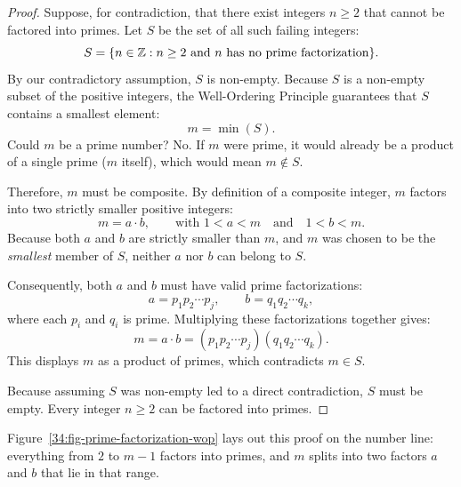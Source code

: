 \begin{proof}
Suppose, for contradiction, that there exist integers $n \geq 2$ that cannot be factored into primes. Let $S$ be the set of all such failing integers:
\[
S = \{n \in \mathbb{Z} : n \ge 2 \text{ and } n \text{ has no prime factorization}\}.
\]
By our contradictory assumption, $S$ is non-empty. Because $S$ is a non-empty subset of the positive integers, the Well-Ordering Principle guarantees that $S$ contains a smallest element:
\[
m = \min(S).
\]
Could $m$ be a prime number? No. If $m$ were prime, it would already be a product of a single prime ($m$ itself), which would mean $m \notin S$.

Therefore, $m$ must be composite. By definition of a composite integer, $m$ factors into two strictly smaller positive integers:
\[
m = a \cdot b, \qquad \text{with } 1 < a < m \quad \text{and} \quad 1 < b < m.
\]
Because both $a$ and $b$ are strictly smaller than $m$, and $m$ was chosen to be the \emph{smallest} member of $S$, neither $a$ nor $b$ can belong to $S$.

Consequently, both $a$ and $b$ must have valid prime factorizations:
\[
a = p_1 p_2 \cdots p_j, \qquad b = q_1 q_2 \cdots q_k,
\]
where each $p_i$ and $q_i$ is prime. Multiplying these factorizations together gives:
\[
m = a \cdot b = (p_1 p_2 \cdots p_j)(q_1 q_2 \cdots q_k).
\]
This displays $m$ as a product of primes, which contradicts $m \in S$.

Because assuming $S$ was non-empty led to a direct contradiction, $S$ must be empty. Every integer $n \geq 2$ can be factored into primes.
\end{proof}

Figure~\ref{34:fig-prime-factorization-wop} lays out this proof on the number line: everything from $2$ to $m-1$ factors into primes, and $m$ splits into two factors $a$ and $b$ that lie in that range.

